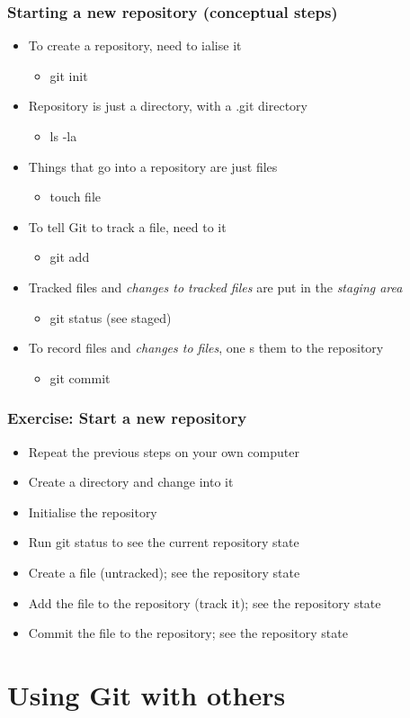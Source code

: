 \documentclass{git_course}
\begin{document}
\begin{frame}
\frametitle{Starting a new repository (conceptual steps)}
\begin{itemize}
    \item To create a repository, need to ialise it
        \begin{itemize}
            \item git init
        \end{itemize}
    \item Repository is just a directory, with a .git directory
        \begin{itemize}
            \item ls -la
        \end{itemize}
    \item Things that go into a repository are just files
        \begin{itemize}
            \item touch file
        \end{itemize}
    \item To tell Git to track a file, need to  it
        \begin{itemize}
            \item git add
        \end{itemize}
    \item Tracked files and \emph{changes to tracked files} are put in
        the \emph{staging area}
        \begin{itemize}
            \item git status (see staged)
        \end{itemize}
    \item To record files and \emph{changes to files}, one s
        them to the repository
        \begin{itemize}
            \item git commit
        \end{itemize}
\end{itemize}
\end{frame}

\begin{frame}
\frametitle{Exercise: Start a new repository}
\begin{itemize}
    \item Repeat the previous steps on your own computer
    \item Create a directory and change into it
    \item Initialise the repository
    \item Run git status to see the current repository state
    \item Create a file (untracked); see the repository state
    \item Add the file to the repository (track it); see the repository state
    \item Commit the file to the repository; see the repository state
\end{itemize}
\end{frame}


\section{Using Git with others}
\end{document}
